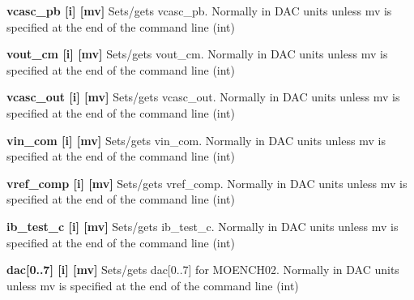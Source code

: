 \begin{DoxyItemize}
\item {\bfseries vcasc\_\-pb \mbox{[}i\mbox{]} \mbox{[}mv\mbox{]}} Sets/gets vcasc\_\-pb. Normally in DAC units unless {\ttfamily mv} is specified at the end of the command line (int)
\end{DoxyItemize}


\begin{DoxyItemize}
\item {\bfseries vout\_\-cm \mbox{[}i\mbox{]} \mbox{[}mv\mbox{]}} Sets/gets vout\_\-cm. Normally in DAC units unless {\ttfamily mv} is specified at the end of the command line (int)
\end{DoxyItemize}


\begin{DoxyItemize}
\item {\bfseries vcasc\_\-out \mbox{[}i\mbox{]} \mbox{[}mv\mbox{]}} Sets/gets vcasc\_\-out. Normally in DAC units unless {\ttfamily mv} is specified at the end of the command line (int)
\end{DoxyItemize}


\begin{DoxyItemize}
\item {\bfseries vin\_\-com \mbox{[}i\mbox{]} \mbox{[}mv\mbox{]}} Sets/gets vin\_\-com. Normally in DAC units unless {\ttfamily mv} is specified at the end of the command line (int)
\end{DoxyItemize}


\begin{DoxyItemize}
\item {\bfseries vref\_\-comp \mbox{[}i\mbox{]} \mbox{[}mv\mbox{]}} Sets/gets vref\_\-comp. Normally in DAC units unless {\ttfamily mv} is specified at the end of the command line (int)
\end{DoxyItemize}


\begin{DoxyItemize}
\item {\bfseries ib\_\-test\_\-c \mbox{[}i\mbox{]} \mbox{[}mv\mbox{]}} Sets/gets ib\_\-test\_\-c. Normally in DAC units unless {\ttfamily mv} is specified at the end of the command line (int)
\end{DoxyItemize}


\begin{DoxyItemize}
\item {\bfseries dac\mbox{[}0..7\mbox{]} \mbox{[}i\mbox{]} \mbox{[}mv\mbox{]}} Sets/gets dac\mbox{[}0..7\mbox{]} for MOENCH02. Normally in DAC units unless {\ttfamily mv} is specified at the end of the command line (int)
\end{DoxyItemize}



